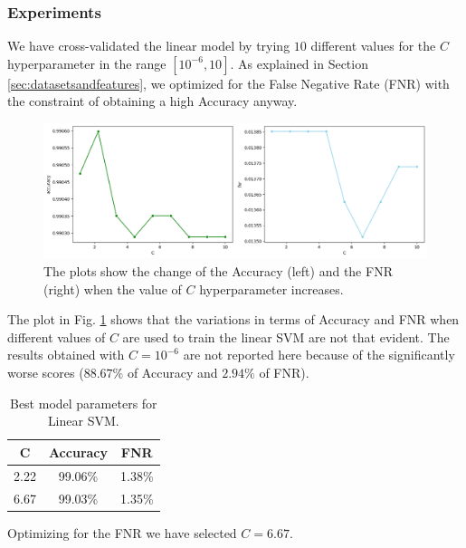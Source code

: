 \documentclass[twocolumn, switch]{article} %
\newcommand\x{0.7}
\begin{document}
\subsubsection{Experiments}
We have cross-validated the linear model by trying $10$ different values for the $C$ hyperparameter in the range $[10^{-6}, 10]$. As explained in Section \ref{sec:datasetsandfeatures}, we optimized for the False Negative Rate (FNR) with the constraint of obtaining a high Accuracy anyway.

\begin{figure}[ht!]
	\centering
	\includegraphics[width=\x\linewidth]{linear_svm_accuracy_fnr.png}
	\caption{The plots show the change of the Accuracy (left) and the FNR (right) when the value of $C$ hyperparameter increases.}
	\label{fig:linearsvm}
\end{figure}

The plot in Fig. \ref{fig:linearsvm} shows that the variations in terms of Accuracy and FNR when different values of $C$ are used to train the linear SVM are not that evident. The results obtained with $C=10^{-6}$ are not reported here because of the significantly worse scores ($88.67\%$ of Accuracy and $2.94\%$ of FNR). 

\begin{table}[ht!]
	\centering
	{\small
		\begin{tabular}{|c|c|c|}
			\hline
			\textbf{C} & \textbf{Accuracy} & \textbf{FNR} \\ \hline
			2.22       & 99.06\%           & 1.38\%       \\ \hline
			6.67       & 99.03\%           & 1.35\%       \\ \hline
		\end{tabular}
	}
	\vspace{1mm}
	\caption{Best model parameters for Linear SVM.}
	\vspace{-6mm}
\end{table}

Optimizing for the FNR we have selected $C=6.67$.
\end{document}
